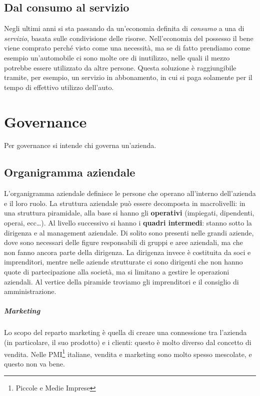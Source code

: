 \section{Dal consumo al servizio} 

Negli ultimi anni si sta passando da un'economia definita di \textit{consumo} a
una di \textit{servizio}, basata sulle condivisione delle risorse.
Nell'economia del possesso il bene viene comprato perché visto come una
necessità, ma se di fatto prendiamo come esempio un'automobile ci sono molte ore
di inutilizzo, nelle quali il mezzo potrebbe essere utilizzato da altre persone.
Questa soluzione è raggiungibile tramite, per esempio, un servizio in
abbonamento, in cui si paga solamente per il tempo di effettivo utilizzo 
dell'auto.


\chapter{Governance}

Per governance si intende chi governa un'azienda.

\section{Organigramma aziendale}
L'organigramma aziendale definisce le persone che operano all'interno
dell'azienda e il loro ruolo. La struttura aziendale può essere decomposta in
macrolivelli: in una struttura piramidale, alla base si hanno gli
\textbf{operativi} (impiegati, dipendenti, operai, ecc\dots). Al livello
successivo si hanno i \textbf{quadri intermedi}: stanno sotto la dirigenza e al
management aziendale. Di solito sono presenti nelle grandi aziende, dove sono
necessari delle figure responsabili di gruppi e aree aziendali, ma che non
fanno ancora parte della dirigenza. La dirigenza invece è costituita da soci e
imprenditori, mentre nelle aziende strutturate ci sono dirigenti che non hanno
quote di partecipazione alla società, ma si limitano a gestire le operazioni
aziendali. Al vertice della piramide troviamo gli imprenditori e il consiglio
di amministrazione.

\paragraph*{Marketing} Lo scopo del reparto marketing è quella di creare una
connessione tra l'azienda (in particolare, il suo prodotto) e i clienti: questo
è molto diverso dal concetto di vendita. Nelle PMI\footnote{Piccole e
Medie Imprese} italiane, vendita e marketing sono molto spesso mescolate, e
questo non va bene.

